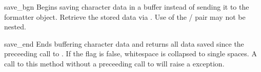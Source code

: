 \begin{funcdesc}{save_bgn}{}
Begins saving character data in a buffer instead of sending it to the
formatter object.  Retrieve the stored data via .
Use of the  /  pair may not be
nested.
\end{funcdesc}

\begin{funcdesc}{save_end}{}
Ends buffering character data and returns all data saved since the
preceeding call to .  If the  flag is
false, whitespace is collapsed to single spaces.  A call to this
method without a preceeding call to  will raise a
 exception.
\end{funcdesc}
